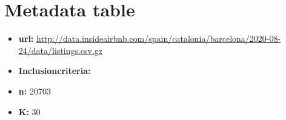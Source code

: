 

\section*{Metadata table}


\vspace{-2em}
\begin{multicols}{2}
\begin{itemize}
         \item \textbf{url:} \url{http://data.insideairbnb.com/spain/catalonia/barcelona/2020-08-24/data/listings.csv.gz}
         \item \textbf{Inclusioncriteria:}
\columnbreak
         \item \textbf{n:} 20703
         \item \textbf{K:} 30
\end{itemize}
\end{multicols}
\vspace{-2em}


